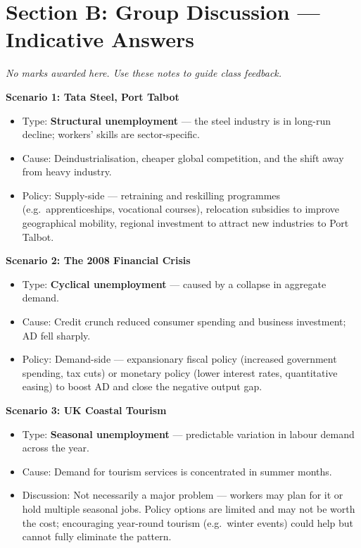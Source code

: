 \documentclass[12pt,a4paper]{article}
\begin{document}
\newpage

\section*{Section B: Group Discussion --- Indicative Answers}

\textit{No marks awarded here. Use these notes to guide class feedback.}

\vspace{0.5em}

\textbf{Scenario 1: Tata Steel, Port Talbot}
\begin{itemize}
    \item Type: \textbf{Structural unemployment} --- the steel industry is in long-run decline; workers' skills are sector-specific.
    \item Cause: Deindustrialisation, cheaper global competition, and the shift away from heavy industry.
    \item Policy: Supply-side --- retraining and reskilling programmes (e.g.\ apprenticeships, vocational courses), relocation subsidies to improve geographical mobility, regional investment to attract new industries to Port Talbot.
\end{itemize}

\vspace{0.5em}

\textbf{Scenario 2: The 2008 Financial Crisis}
\begin{itemize}
    \item Type: \textbf{Cyclical unemployment} --- caused by a collapse in aggregate demand.
    \item Cause: Credit crunch reduced consumer spending and business investment; AD fell sharply.
    \item Policy: Demand-side --- expansionary fiscal policy (increased government spending, tax cuts) or monetary policy (lower interest rates, quantitative easing) to boost AD and close the negative output gap.
\end{itemize}

\vspace{0.5em}

\textbf{Scenario 3: UK Coastal Tourism}
\begin{itemize}
    \item Type: \textbf{Seasonal unemployment} --- predictable variation in labour demand across the year.
    \item Cause: Demand for tourism services is concentrated in summer months.
    \item Discussion: Not necessarily a major problem --- workers may plan for it or hold multiple seasonal jobs. Policy options are limited and may not be worth the cost; encouraging year-round tourism (e.g.\ winter events) could help but cannot fully eliminate the pattern.
\end{itemize}
\end{document}
